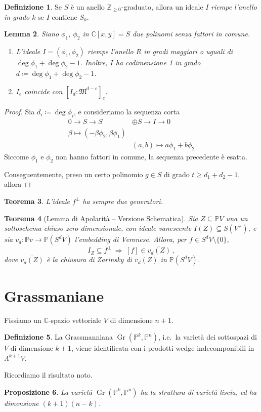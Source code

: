 \documentclass[a4paper, 11pt]{article}
\theoremstyle{definition}
\newtheorem{Def}{Definizione}[section]
\theoremstyle{plain}
\newtheorem{Lemma}[Def]{Lemma}
\newtheorem{Prop}[Def]{Proposizione}
\newtheorem{Teo}[Def]{Teorema}
\newcommand{\PP}{\mathbb{P}}
\newcommand{\C}{\mathbb{C}}
\newcommand{\Z}{\mathbb{Z}}
\newcommand{\MM}{\mathfrak{M}}
\newcommand{\deff}{\coloneqq}
\DeclareMathOperator{\Gr}{Gr}
\begin{document}
\begin{Def}
		Se $S$ è un anello $\Z_{\ge 0}$-graduato, allora un ideale $I$ \emph{riempe l'anello in grado $k$} se $I$ contiene $S_k$.
\end{Def}
\begin{Lemma}
	Siano $\phi_1$, $\phi_2$ in $\C[x,y] = S$ due polinomi senza fattori in comune.
	\begin{enumerate}
		\item L'ideale $I = (\phi_1, \phi_2)$ riempe l'anello $R$ in gradi maggiori o uguali di $\deg \phi_1 + \deg \phi_2 - 1$. Inoltre, $I$ ha codimensione 1 in grado $d \deff \deg \phi_1 + \deg \phi_2 -1 $.
		\item  $I_e$ coincide con $[I_d \colon \MM^{d-e}]_e$.
	\end{enumerate}
\end{Lemma}
\begin{proof}
	Sia $d_i \deff \deg \phi_i$, e consideriamo la sequenza corta
	\[
	\begin{split}
		0 \to S \to S &\oplus S \to I \to 0\\
		\beta \mapsto (-\beta\phi_2, \beta\phi_1)\\
		&(a,b) \mapsto a\phi_1 + b\phi_2
	\end{split}
	\]
	Siccome $\phi_1$ e $\phi_2$ non hanno fattori in comune, la sequenza precedente è esatta.
	
	Conseguentemente, preso un certo polinomio $g \in S$ di grado $t \ge d_1 + d_2 -1$, allora 
\end{proof}

\begin{Teo}
	L'ideale $f^\bot$ ha sempre due generatori.	
\end{Teo}
\begin{Teo}[Lemma di Apolarità -- Versione Schematica]
	Sia $Z \subseteq \PP V$ una un sottoschema chiuso zero-dimensionale, con ideale vanescente $I(Z) \subseteq S(V^\vee)$, e sia $v_d \colon \PP v \to \PP(S^dV)$ l'embedding di Veronese. Allora, per $f \in S^d V \setminus \{0\}$,
	\[
		I_Z \subseteq f^\bot\ \Rightarrow\ [f] \in \overline{v_d(Z)}\,,
	\]
	dove $\overline{v_d(Z)}$ è la chiusura di Zarinsky di $v_d(Z)$ in $\PP(S^d V)$.
\end{Teo}
\section{Grassmaniane}
Fissiamo un $\C$-spazio vettoriale $V$ di dimensione $n+1$.
\begin{Def}
	La Grassmanniana $\Gr(\PP^k, \PP^n)$, i.e.\ la varietà dei sottospazi di $V$ di dimensione $k+1$, viene identificata con i prodotti wedge indecomponibili in $\Lambda^{k+1} V$.
\end{Def}
Ricordiamo il risultato noto.
\begin{Prop}
	La varietà $\Gr(\PP^k, \PP^n)$ ha la struttura di varietà liscia, ed ha dimensione $(k+1)(n-k)$.
\end{Prop}
\end{document}
